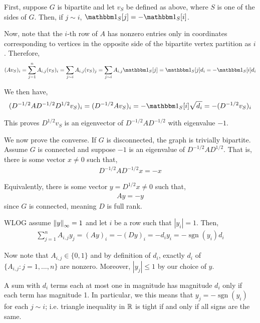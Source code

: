 \documentclass[10pt]{article}
\newcommand{\sgn}{\operatorname{sgn}}
\begin{document}
\begin{solution}[Solution]
    
    First, suppose \( G \) is bipartite and let \( v_S \) be defined as above, where \( S \) is one of the sides of \( G \). Then, if \( j\sim i \), \( \bOne_S[j] = -\bOne_S[i] \).

    Now, note that the \( i \)-th row of \( A \) has nonzero entries only in coordinates corresponding to vertices in the opposite side of the bipartite vertex partition as \( i \). Therefore, 
    \begin{align*}
        (Av_S)_i = \sum_{j=1}^{n} A_{i,j} (v_S)_i
        = \sum_{j\sim i}^{} A_{i,j} (v_S)_j
        = \sum_{j\sim i}^{} A_{i,j} \bOne_S[j]
        = \bOne_S[j] d_{i}
        = -\bOne_S[i] d_{i}
    \end{align*}
    
    We then have, 
    \begin{align*}
        (D^{-1/2} A D^{-1/2}D^{1/2} v_S)_i 
        = (D^{-1/2} Av_S)_i 
        = -\bOne_S[i]\sqrt{d_i} 
        = -(D^{-1/2}v_S)_i 
    \end{align*}


    This proves \( D^{1/2} v_S \) is an eigenvector of \( D^{-1/2}A D^{-1/2} \) with eigenvalue \( -1 \). 


    We now prove the converse. If \( G \) is disconnected, the graph is trivially bipartite. Assume \( G \) is connected and suppose \( -1 \) is an eigenvalue of \( D^{-1/2}AD^{1/2} \). That is, there is some vector \( x\neq 0 \) such that,
    \begin{align*}
        D^{-1/2}AD^{-1/2}x = -x
    \end{align*}
    
    Equivalently, there is some vector \( y  = D^{1/2} x \neq 0 \) such that,
    \begin{align*}
        A y = - y
    \end{align*}
    since \( G \) is connected, meaning \( D \) is full rank. 
    
    WLOG assume \( \left\lVert y\right\rVert_\infty = 1 \) and let \( i \) be a row such that \( |y_i| = 1 \). Then,
    \begin{align*}
        \sum_{j=1}^{n} A_{i,j} y_j = (Ay)_i = - (Dy)_i = -d_iy_i = -\sgn(y_i) d_i
    \end{align*}
    
    Now note that \( A_{i,j} \in \{0,1\} \) and by definition of \( d_i \), exactly \( d_i \) of \( \{A_{i,j} : j=1,\ldots,n\} \) are nonzero. Moreover, \( |y_j| \leq 1 \) by our choice of \( y \).
    
    A sum with \( d_i \) terms each at most one in magnitude has magnitude \( d_i \) only if each term has magnitude 1. In particular, we this means that \( y_j = -\sgn(y_i) \) for each \( j\sim i \); i.e. triangle inequality in \( \mathbb{R} \) is tight if and only if all signs are the same.


\end{solution}
\end{document}
